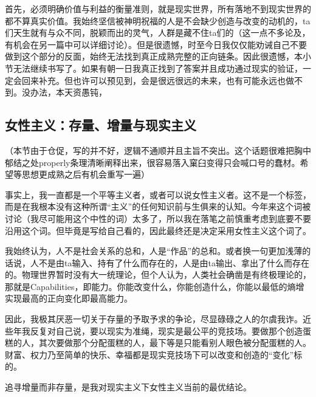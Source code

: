 \documentclass[11pt,twoside,fontset=none,scheme=plain]{ctexart}
\begin{document}
首先，必须明确价值与利益的衡量准则，就是现实世界，所有落地不到现实世界的都不算真实价值。我始终坚信被神明祝福的人是不会缺少创造与改变的动机的，ta们天生就有与众不同，脱颖而出的灵气，人群是藏不住ta们的（这一点不多论及，有机会在另一篇中可以详细讨论）。但是很遗憾，时至今日我仅仅能劝诫自己不要做到这个部分的反面，始终无法找到真正成熟完整的正向链条。因此很遗憾，本小节无法继续书写了。如果有朝一日我真正找到了答案并且成功通过现实的验证，一定会回来补充。但也许可以预见到，会是很远很远的未来，也有可能永远也做不到。没办法，本天资愚钝，

\subsection{女性主义：存量、增量与现实主义}
（本节由于仓促，写的并不好，逻辑不通顺并且主旨不突出。这个话题很难把胸中郁结之处properly条理清晰阐释出来，很容易落入窠臼变得只会喊口号的蠢材。希望等思想更成熟之后有机会重写一遍）

事实上，我一直都是一个平等主义者，或者可以说女性主义者。这不是一个标签，而是在我根本没有这种所谓“主义”的任何知识前与生俱来的认知。今年来这个词被讨论（我尽可能用这个中性的词）太多了，所以我在落笔之前慎重考虑到底要不要沿用这个词。但毕竟是写给自己看的，因此最终还是决定采用女性主义这个词了。

我始终认为，人不是社会关系的总和，人是“作品”的总和。或者换一句更加浅薄的话说，人不是由ta输入、持有了什么而存在的，人是由ta输出、拿出了什么而存在的。物理世界暂时没有大一统理论，但个人认为，人类社会确凿是有终极理论的，那就是Capabilities，即能力。你能改变什么，你能创造什么，你能以最低的熵增实现最高的正向变化即最高能力。

因此，我极其厌恶一切关于存量的予取予求的争论，尽显碌碌之人的尔虞我诈。近些年我反复对自己说，要以现实为准绳，现实是最公平的竞技场。要做那个创造蛋糕的人，其次要做那个分配蛋糕的人，最下等是只能看别人眼色被分配蛋糕的人。财富、权力乃至简单的快乐、幸福都是现实竞技场下可以改变和创造的“变化”标的。

追寻增量而非存量，是我对现实主义下女性主义当前的最优结论。
\end{document}
